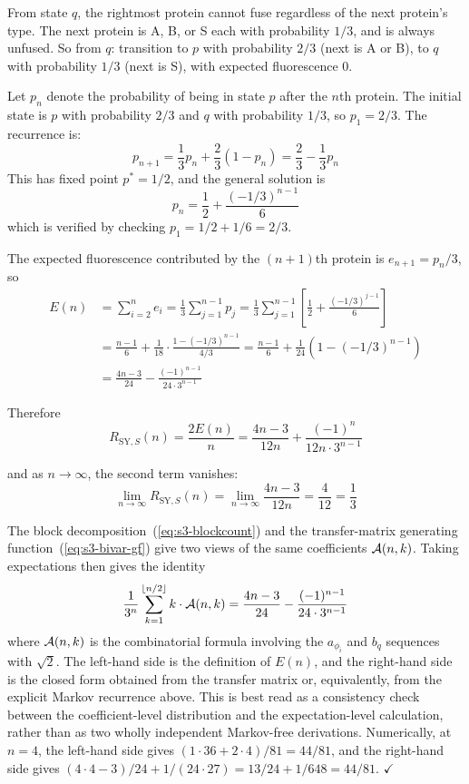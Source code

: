 \documentclass[11pt]{article}
\DeclarePairedDelimiter\floor{\lfloor}{\rfloor}
\newcommand{\cA}{ {\cal A} }
\begin{document}
From state $q$, the rightmost protein cannot fuse regardless of the next protein's type. The next protein is A, B, or S each with probability $1/3$, and is always unfused. So from $q$: transition to $p$ with probability $2/3$ (next is A or B), to $q$ with probability $1/3$ (next is S), with expected fluorescence $0$.

Let $p_n$ denote the probability of being in state $p$ after the $n$th protein. The initial state is $p$ with probability $2/3$ and $q$ with probability $1/3$, so $p_1 = 2/3$. The recurrence is:
\[
p_{n+1} = \frac{1}{3} p_n + \frac{2}{3}(1 - p_n) = \frac{2}{3} - \frac{1}{3} p_n
\]
This has fixed point $p^* = 1/2$, and the general solution is
\[
p_n = \frac{1}{2} + \frac{(-1/3)^{n-1}}{6}
\]
which is verified by checking $p_1 = 1/2 + 1/6 = 2/3$.

The expected fluorescence contributed by the $(n+1)$th protein is $e_{n+1} = p_n / 3$, so
\begin{align*}
E(n) &= \sum_{i=2}^{n} e_i = \frac{1}{3} \sum_{j=1}^{n-1} p_j = \frac{1}{3} \sum_{j=1}^{n-1} \left[ \frac{1}{2} + \frac{(-1/3)^{j-1}}{6} \right] \\
&= \frac{n-1}{6} + \frac{1}{18} \cdot \frac{1 - (-1/3)^{n-1}}{4/3} = \frac{n-1}{6} + \frac{1}{24}\left(1 - (-1/3)^{n-1}\right) \\
&= \frac{4n - 3}{24} - \frac{(-1)^{n-1}}{24 \cdot 3^{n-1}}
\end{align*}

Therefore
\[
R_{\text{SY},S}(n) = \frac{2E(n)}{n} = \frac{4n-3}{12n} + \frac{(-1)^n}{12n \cdot 3^{n-1}}
\]

and as $n \to \infty$, the second term vanishes:
\[
\lim_{n \to \infty} R_{\text{SY},S}(n) = \lim_{n \to \infty} \frac{4n - 3}{12n} = \frac{4}{12} = \frac{1}{3}
\]

The block decomposition~(\ref{eq:s3-blockcount}) and the transfer-matrix generating function~(\ref{eq:s3-bivar-gf}) give two views of the same coefficients $\cA(n,k)$. Taking expectations then gives the identity
\[
\frac{1}{3^n} \sum_{k=1}^{\floor{n/2}} k \cdot \cA(n,k) = \frac{4n-3}{24} - \frac{(-1)^{n-1}}{24 \cdot 3^{n-1}}
\]
where $\cA(n,k)$ is the combinatorial formula involving the $a_{\phi_i}$ and $b_q$ sequences with $\sqrt{2}$. The left-hand side is the definition of $E(n)$, and the right-hand side is the closed form obtained from the transfer matrix or, equivalently, from the explicit Markov recurrence above. This is best read as a consistency check between the coefficient-level distribution and the expectation-level calculation, rather than as two wholly independent Markov-free derivations. Numerically, at $n = 4$, the left-hand side gives $(1 \cdot 36 + 2 \cdot 4)/81 = 44/81$, and the right-hand side gives $(4 \cdot 4 - 3)/24 + 1/(24 \cdot 27) = 13/24 + 1/648 = 44/81$. $\checkmark$
\end{document}
